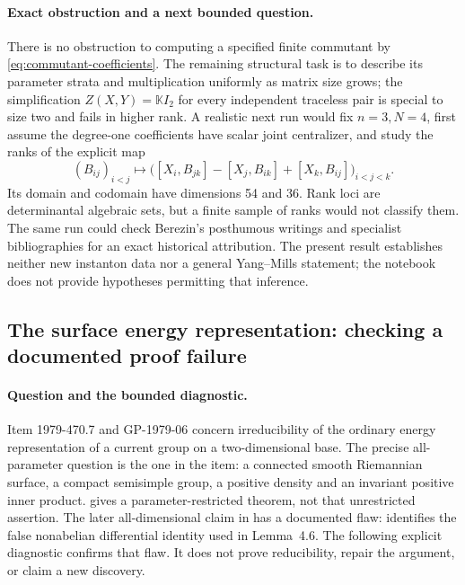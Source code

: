 \paragraph{Exact obstruction and a next bounded question.}
There is no obstruction to computing a specified finite commutant by \eqref{eq:commutant-coefficients}. The remaining structural task is to describe its parameter strata and multiplication uniformly as matrix size grows; the simplification \(Z(X,Y)=\mathbb K I_2\) for every independent traceless pair is special to size two and fails in higher rank. A realistic next run would fix \(n=3,N=4\), first assume the degree-one coefficients have scalar joint centralizer, and study the ranks of the explicit map
\[
 (B_{ij})_{i<j}\longmapsto
 \bigl([X_i,B_{jk}]-[X_j,B_{ik}]+[X_k,B_{ij}]\bigr)_{i<j<k}.
\]
Its domain and codomain have dimensions 54 and 36. Rank loci are determinantal algebraic sets, but a finite sample of ranks would not classify them. The same run could check Berezin's posthumous writings and specialist bibliographies for an exact historical attribution. The present result establishes neither new instanton data nor a general Yang--Mills statement; the notebook does not provide hypotheses permitting that inference.

\subsection{The surface energy representation: checking a documented proof failure}
\label{dev:energy-diagnostic}

\paragraph{Question and the bounded diagnostic.}
Item 1979-470.7 and GP-1979-06 concern irreducibility of the ordinary energy representation of a current group on a two-dimensional base. The precise all-parameter question is the one in the item: a connected smooth Riemannian surface, a compact semisimple group, a positive density and an invariant positive inner product. \citet[Theorem~6.2]{wallach1987gauge} gives a parameter-restricted theorem, not that unrestricted assertion. The later all-dimensional claim in \citet{shimada2005irreducibility} has a documented flaw: \citet[p.~1, revised version of 15 January 2011]{hasebe2010white} identifies the false nonabelian differential identity used in Lemma~4.6. The following explicit diagnostic confirms that flaw. It does not prove reducibility, repair the argument, or claim a new discovery.

